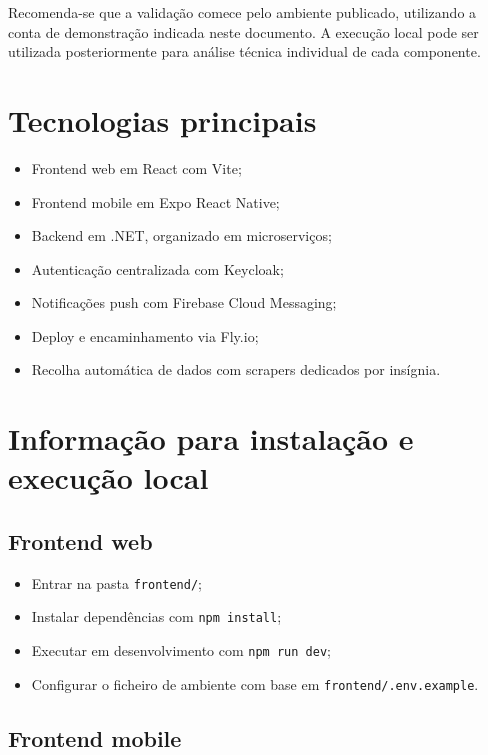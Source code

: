 \documentclass[a4paper,11pt]{article}
\let\oldsection\section
\renewcommand{\section}{\Needspace{8\baselineskip}\oldsection}
\begin{document}
Recomenda-se que a valida\c{c}\~ao comece pelo ambiente publicado, utilizando a conta de demonstra\c{c}\~ao indicada neste documento. A execu\c{c}\~ao local pode ser utilizada posteriormente para an\'alise t\'ecnica individual de cada componente.

\section{Tecnologias principais}

\begin{itemize}[leftmargin=1.8em]
    \item Frontend web em React com Vite;
    \item Frontend mobile em Expo React Native;
    \item Backend em .NET, organizado em microservi\c{c}os;
    \item Autentica\c{c}\~ao centralizada com Keycloak;
    \item Notifica\c{c}\~oes push com Firebase Cloud Messaging;
    \item Deploy e encaminhamento via Fly.io;
    \item Recolha autom\'atica de dados com scrapers dedicados por ins\'ignia.
\end{itemize}

\section{Informa\c{c}\~ao para instala\c{c}\~ao e execu\c{c}\~ao local}

\subsection{Frontend web}

\begin{itemize}[leftmargin=1.8em]
    \item Entrar na pasta \texttt{frontend/};
    \item Instalar depend\^encias com \texttt{npm install};
    \item Executar em desenvolvimento com \texttt{npm run dev};
    \item Configurar o ficheiro de ambiente com base em \texttt{frontend/.env.example}.
\end{itemize}

\subsection{Frontend mobile}
\end{document}
